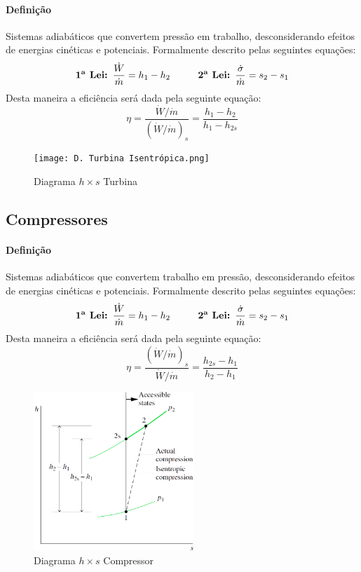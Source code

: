 \documentclass{article}
\begin{document}
            \paragraph{Definição}Sistemas adiabáticos que convertem pressão em trabalho, desconsiderando efeitos de energias cinéticas e potenciais. Formalmente descrito pelas seguintes equações: 
                \[
                    \textbf{1\textsuperscript{a} Lei: } \frac{\dot{W}}{\dot{m}} = h_{1} - h_{2} \hspace{10mm} 
                    \textbf{2\textsuperscript{a} Lei: } \frac{\dot{\sigma}}{\dot{m}} = s_{2} - s_{1}
                \]
            Desta maneira a eficiência será dada pela seguinte equação:
                \[\boxed{\eta = \frac{\dot{W}/\dot{m}}{(\dot{W}/\dot{m})_{s}} = \frac{h_{1} - h_{2}}{h_{1} - h_{2s}}}\]
                \begin{figure}[h]
                    \centering
                    \texttt{[image: D. Turbina Isentrópica.png]}
                    \vspace*{-4mm}
                    \caption{Diagrama $h\times s$ Turbina}
                \end{figure}

        \subsection{Compressores}
            \paragraph{Definição}Sistemas adiabáticos que convertem trabalho em pressão, desconsiderando efeitos de energias cinéticas e potenciais. Formalmente descrito pelas seguintes equações:
                \[
                    \textbf{1\textsuperscript{a} Lei: } \frac{\dot{W}}{\dot{m}} = h_{1} - h_{2} \hspace{10mm} 
                    \textbf{2\textsuperscript{a} Lei: } \frac{\dot{\sigma}}{\dot{m}} = s_{2} - s_{1}
                \]
            Desta maneira a eficiência será dada pela seguinte equação:
                \[\boxed{\eta = \frac{(\dot{W}/\dot{m})_{s}}{\dot{W}/\dot{m}} = \frac{h_{2s} - h_{1}}{h_{2} - h_{1}}}\]
                \begin{figure}[h]
                    \centering
                    \includegraphics[height = 6cm]{D. Compressão Isentrópica.png}
                    \caption{Diagrama $h\times s$ Compressor}
                \end{figure}
\end{document}
